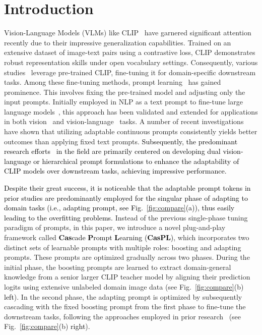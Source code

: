 \documentclass[runningheads]{llncs}
\newcommand{\implus}[1]{\textcolor{black}{#1}}
\newcommand{\important}[1]{\textcolor{black}{#1}}
\newcommand{\lz}[1]{\textcolor{black}{#1}}
\begin{document}
\section{Introduction}
\label{sec:intro}
Vision-Language Models (VLMs) like CLIP~\cite{radford2021learning} have garnered significant attention recently due to their impressive generalization capabilities. Trained on an extensive dataset of image-text pairs using a contrastive loss, CLIP demonstrates robust representation skills under open vocabulary settings. Consequently, various studies~\cite{luddecke2022image,yu2023turning,zhong2022regionclip,gu2021open,ding2022decoupling} leverage pre-trained CLIP, fine-tuning it for domain-specific downstream tasks.
Among these fine-tuning methods, prompt learning~\cite{li2021prefix,brown2020language,lester2021power,liu2022p}
has gained prominence. This involves fixing the pre-trained model and adjusting only the input prompts. Initially employed in NLP as a text prompt to fine-tune large language models~\cite{devlin2018bert}, this approach has been validated and extended for applications in both vision~\cite{jia2022visual, wang2022dualprompt, wang2022learning} and vision-language~\cite{zhou2022learning,zhou2022conditional, khattak2023self,khattak2023maple,li2024promptkd} tasks.
A number of recent investigations~\cite{zhou2022learning,zhu2023prompt} have shown that utilizing adaptable continuous prompts consistently yields better outcomes than applying fixed text prompts.
\implus{Subsequently, the predominant research efforts~\cite{zang2022unified,zhou2022conditional,khattak2023maple, khattak2023self, lu2022prompt} in the field are primarily centered on developing dual vision-language or hierarchical prompt formulations to enhance the adaptability of CLIP models over downstream tasks, achieving impressive performance.}


\important{Despite their great success, it is noticeable that the adaptable prompt tokens in prior studies are predominantly employed for the singular phase of adapting to domain tasks (i.e., adapting prompt, see Fig.~\ref{fig:compare}(a)), thus easily leading to the overfitting problems.} Instead of the previous single-phase tuning paradigm of prompts, in this paper, we introduce a novel plug-and-play framework called \lz{\textbf{Cas}cade \textbf{P}rompt \textbf{L}earning (\textbf{CasPL})}, which incorporates two distinct sets of learnable prompts with multiple roles: boosting and adapting prompts. These prompts are optimized gradually across two phases. During the initial phase, the boosting prompts are learned to extract domain-general knowledge from a senior larger CLIP teacher model by aligning their prediction logits using extensive unlabeled domain image data (see Fig.~\ref{fig:compare}(b) \lz{left}). In the second phase, the adapting prompt is optimized by subsequently cascading with the fixed boosting prompt from the first phase to fine-tune the downstream tasks, following the approaches employed in prior research~\cite{zhou2022learning,zhu2023prompt,zang2022unified,zhou2022conditional,khattak2023maple, khattak2023self} (see Fig.~\ref{fig:compare}(b) \lz{right}).
\end{document}
